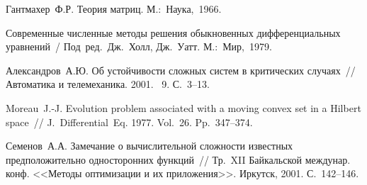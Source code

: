 \documentclass[12pt]{llncs}  %
\begin{document}




%

%

\begin{thebibliography}{9} %
 Гантмахер~Ф.Р. Теория матриц. М.:~Наука,~1966.

 Современные численные методы решения обыкновенных дифференциальных уравнений~/ Под~ред.~Дж.~Холл, Дж.~Уатт. М.:~Мир,~1979.

 Александров~А.Ю. Об устойчивости сложных систем в критических случаях~// Автоматика и телемеханика. 2001. \textnumero~9. С.~3--13.

 Moreau~J.-J. Evolution problem associated with a moving convex set in a Hilbert space~// J.~Differential~Eq. 1977. Vol.~26. Pp.~347--374.

 Семенов~А.А. Замечание о вычислительной сложности известных предположительно односторонних функций~// Тр.~XII Байкальской междунар. конф. <<Методы оптимизации и их приложения>>. Иркутск, 2001. С.~142--146.

\end{thebibliography}
\end{document}
